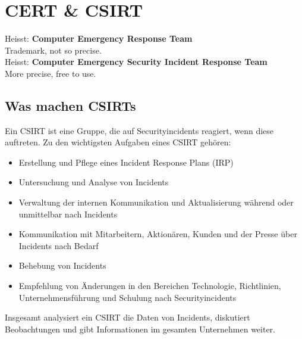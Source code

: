 \section{CERT \& CSIRT}
Heisst: \textbf{Computer Emergency Response Team}\\
Trademark, not so precise.\\
Heisst: \textbf{Computer Emergency Security Incident Response Team}\\
More precise, free to use.

\subsection{Was machen CSIRTs}
Ein CSIRT ist eine Gruppe, die auf Securityincidents reagiert, wenn diese auftreten. 
Zu den wichtigsten Aufgaben eines CSIRT gehören:
\begin{itemize}
  \item Erstellung und Pflege eines Incident Response Plans (IRP)
  \item Untersuchung und Analyse von Incidents
  \item Verwaltung der internen Kommunikation und Aktualisierung während oder unmittelbar nach Incidents
  \item Kommunikation mit Mitarbeitern, Aktionären, Kunden und der Presse über Incidents nach Bedarf
  \item Behebung von Incidents
  \item Empfehlung von Änderungen in den Bereichen Technologie, Richtlinien, Unternehmensführung und Schulung nach Securityincidents
\end{itemize}

Insgesamt analysiert ein CSIRT die Daten von Incidents, diskutiert Beobachtungen und gibt Informationen im gesamten Unternehmen weiter.
